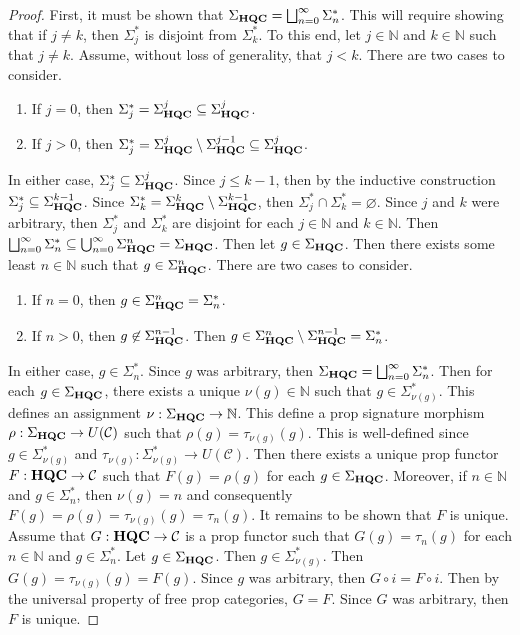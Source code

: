 \begin{proof}
    First, it must be shown that $\Sigma_{\mathbf{HQC}} = \bigsqcup_{n=0}^\infty \Sigma_n^*$.
    This will require showing that if $j \ne k$, then $\Sigma_j^*$ is disjoint from $\Sigma_k^*$.
    To this end, let $j \in \mathbb{N}$ and $k \in \mathbb{N}$ such that $j \ne k$.
    Assume, without loss of generality, that $j < k$.
    There are two cases to consider.
    \begin{enumerate}
    \item If $j = 0$, then $\Sigma_j^* = \Sigma_{\mathbf{HQC}}^j \subseteq \Sigma_{\mathbf{HQC}}^j$.
    \item If $j > 0$, then $\Sigma_j^* = \Sigma_{\mathbf{HQC}}^j \setminus \Sigma_{\mathbf{HQC}}^{j-1} \subseteq \Sigma_{\mathbf{HQC}}^j$.
    \end{enumerate}
    In either case, $\Sigma_j^* \subseteq \Sigma_{\mathbf{HQC}}^j$.
    Since $j \le k - 1$, then by the inductive construction $\Sigma_j^* \subseteq \Sigma_{\mathbf{HQC}}^{k-1}$.
    Since $\Sigma_k^* = \Sigma_{\mathbf{HQC}}^k \setminus \Sigma_{\mathbf{HQC}}^{k-1}$, then $\Sigma_j^* \cap \Sigma_k^* = \varnothing$.
    Since $j$ and $k$ were arbitrary, then $\Sigma_j^*$ and $\Sigma_k^*$ are disjoint for each $j \in \mathbb{N}$ and $k \in \mathbb{N}$.
    Then $\bigsqcup_{n=0}^\infty \Sigma_n^* \subseteq \bigcup_{n=0}^\infty \Sigma_{\mathbf{HQC}}^n = \Sigma_{\mathbf{HQC}}$.
    Then let $g \in \Sigma_{\mathbf{HQC}}$.
    Then there exists some least $n \in \mathbb{N}$ such that $g \in \Sigma_{\mathbf{HQC}}^n$.
    There are two cases to consider.
    \begin{enumerate}
    \item If $n = 0$, then $g \in \Sigma_{\mathbf{HQC}}^n = \Sigma_n^*$.
    \item If $n > 0$, then $g \not \in \Sigma_{\mathbf{HQC}}^{n-1}$.
          Then $g \in \Sigma_{\mathbf{HQC}}^n \setminus \Sigma_{\mathbf{HQC}}^{n-1} = \Sigma_n^*$.
    \end{enumerate}
    In either case, $g \in \Sigma_n^*$.
    Since $g$ was arbitrary, then $\Sigma_{\mathbf{HQC}} = \bigsqcup_{n=0}^\infty \Sigma_n^*$.
    Then for each $g \in \Sigma_{\mathbf{HQC}}$, there exists a unique $\nu(g) \in \mathbb{N}$ such that $g \in \Sigma_{\nu(g)}^*$.
    This defines an assignment $\nu: \Sigma_{\mathbf{HQC}} \to \mathbb{N}$.
    This define a prop signature morphism $\rho: \Sigma_{\mathbf{HQC}} \to U( \mathcal{C} )$ such that $\rho( g ) = \tau_{\nu(g)}( g )$.
    This is well-defined since $g \in \Sigma_{\nu(g)}^*$ and $\tau_{\nu(g)}: \Sigma_{\nu(g)}^* \to U( \mathcal{C} )$.
    Then there exists a unique prop functor $F: \mathbf{HQC} \to \mathcal{C}$ such that $F( g ) = \rho( g )$ for each $g \in \Sigma_{\mathbf{HQC}}$.
    Moreover, if $n \in \mathbb{N}$ and $g \in \Sigma_n^*$, then $\nu( g ) = n$ and consequently $F( g ) = \rho( g ) = \tau_{\nu(g)}( g ) = \tau_n( g )$.
    It remains to be shown that $F$ is unique.
    Assume that $G: \mathbf{HQC} \to \mathcal{C}$ is a prop functor such that $G( g ) = \tau_n( g )$ for each $n \in \mathbb{N}$ and $g \in \Sigma_n^*$.
    Let $g \in \Sigma_{\mathbf{HQC}}$.
    Then $g \in \Sigma_{\nu(g)}^*$.
    Then $G( g ) = \tau_{\nu(g)}( g ) = F( g )$.
    Since $g$ was arbitrary, then $G \circ i = F \circ i$.
    Then by the universal property of free prop categories, $G = F$.
    Since $G$ was arbitrary, then $F$ is unique.
\end{proof}